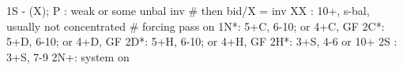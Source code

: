 1S - (X);
P  : weak or some unbal inv  # then bid/X = inv
XX : 10+, s-bal, usually not concentrated  # forcing pass on
1N*: 5+C, 6-10; or 4+C, GF
2C*: 5+D, 6-10; or 4+D, GF
2D*: 5+H, 6-10; or 4+H, GF
2H*: 3+S, 4-6 or 10+
2S : 3+S, 7-9
2N+: system on